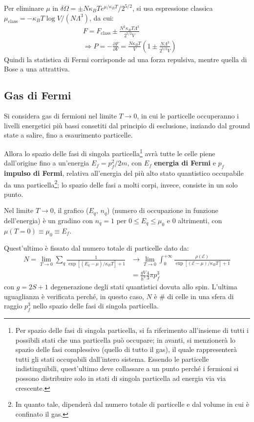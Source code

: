 \documentclass[10pt, a4paper]{scrartcl}
\numberwithin{equation}{subsection}
\theoremstyle{style1}
\begin{document}
Per eliminare $\mu $ in $\delta \Omega  = \pm N\kappa _B Te^{\mu  / \kappa _B T} / 2^{5 / 2} $, si usa espressione classica $\mu _\text{class}= - \kappa _B T \log V /(N\Lambda ^3)$, da cui:
\begin{equation}
	\begin{split}
		&F = F_\text{class} \pm \frac{N^2 \kappa _B T \Lambda ^3}{2^{5 / 2}V }\\
		& \Rightarrow P = - \frac{\partial F }{\partial V } = \frac{N\kappa _B T}{V}\left(1 \pm \frac{N\Lambda ^3}{2^{5 / 2} V}\right) 
	\end{split}
\end{equation}
Quindi la statistica di Fermi corrisponde ad una forza repulsiva, mentre quella di Bose a una attrattiva.
\subsection{Gas di Fermi}

Si considera gas di fermioni nel limite $T \to 0 $, in cui le particelle occuperanno i livelli energetici pi\`u bassi consetiti dal principio di esclusione, inziando dal ground state a salire, fino a esaurimento particelle. 

Allora lo spazio delle fasi di singola particella\footnote{Per spazio delle fasi di singola particella, si fa riferimento all'insieme di tutti i possibili stati che una particella pu\`o occupare; in avanti, si menzioner\`a lo spazio delle fasi complessivo (quello di tutto il gas), il quale rappresenter\`a tutti gli stati occupabili dall'intero sistema. Essendo le particelle indistinguibili, quest'ultimo deve collassare a un punto perch\'e i fermioni si possono distribuire solo in stati di singola particella ad energia via via crescente.} avr\`a tutte le celle piene dall'origine fino a un'energia $E_f = p_f^2 / 2m$, con $E_f$ \textbf{energia di Fermi} e $p_f$ \textbf{impulso di Fermi}, relativa all'energia del pi\`u alto stato quantistico occupabile da una particella\footnote{In quanto tale, dipender\`a dal numero totale di particelle e dal volume in cui è confinato il gas.}; lo spazio delle fasi a molti corpi, invece, consiste in un solo punto.

Nel limite $T\to 0$, il grafico ($E_q$, $n_q$) (numero di occupazione in funzione dell'energia) \`e un gradino con $n_q = 1$ per $0\le E_q\le \mu_0$ e $0$ altrimenti, con $\mu (T=0) \equiv \mu_{0}\equiv E_f$.

Quest'ultimo \`e fissato dal numero totale di particelle dato da:
\begin{equation}
	\begin{split}
		N = \lim_{T \to 0} \sum_{q}^{} \frac{1}{\exp\left[ (E_q - \mu  ) / \kappa _B T \right]  + 1 } &\to \lim_{T \to 0 } \int_{0} ^{+\infty} \frac{\rho (\mathscr{E})}{\exp\left[ (\mathscr{E}-\mu ) / \kappa _B T \right] + 1}\\
		  & =  \frac{gV}{h^3}\frac{4}{3}\pi p^3_f
	\end{split}
\end{equation}
con $g = 2S + 1$ degenerazione degli stati quantistici dovuta allo spin. L'ultima uguaglianza \`e verificata perch\'e, in questo caso, $N$ \`e \# di celle in una sfera di raggio $p_f^3$ nello spazio delle fasi di singola particella. 
\end{document}
